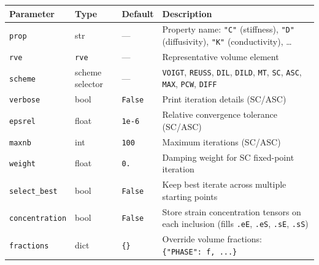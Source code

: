 \documentclass[
  a4paper,
  numbers=noendperiod,
  DIV=12]{scrreprt}
\newcounter{none} %
\begin{document}
{\def\LTcaptype{none} %
\begin{longtable}[]{@{}
  >{\raggedright\arraybackslash}p{}
  >{\raggedright\arraybackslash}p{}
  >{\raggedright\arraybackslash}p{}
  >{\raggedright\arraybackslash}p{}@{}}
\toprule\noalign{}
\begin{minipage}[b]{\linewidth}\raggedright
Parameter
\end{minipage} & \begin{minipage}[b]{\linewidth}\raggedright
Type
\end{minipage} & \begin{minipage}[b]{\linewidth}\raggedright
Default
\end{minipage} & \begin{minipage}[b]{\linewidth}\raggedright
Description
\end{minipage} \\
\midrule\noalign{}
\endhead
\bottomrule\noalign{}
\endlastfoot
\texttt{prop} & str & --- & Property name: \texttt{"C"} (stiffness),
\texttt{"D"} (diffusivity), \texttt{"K"} (conductivity), \ldots{} \\
\texttt{rve} & \texttt{rve} & --- & Representative volume element \\
\texttt{scheme} & scheme selector & --- & \texttt{VOIGT},
\texttt{REUSS}, \texttt{DIL}, \texttt{DILD}, \texttt{MT}, \texttt{SC},
\texttt{ASC}, \texttt{MAX}, \texttt{PCW}, \texttt{DIFF} \\
\texttt{verbose} & bool & \texttt{False} & Print iteration details
(SC/ASC) \\
\texttt{epsrel} & float & \texttt{1e-6} & Relative convergence tolerance
(SC/ASC) \\
\texttt{maxnb} & int & \texttt{100} & Maximum iterations (SC/ASC) \\
\texttt{weight} & float & \texttt{0.} & Damping weight for SC
fixed-point iteration \\
\texttt{select\_best} & bool & \texttt{False} & Keep best iterate across
multiple starting points \\
\texttt{concentration} & bool & \texttt{False} & Store strain
concentration tensors on each inclusion (fills \texttt{.eE},
\texttt{.eS}, \texttt{.sE}, \texttt{.sS}) \\
\texttt{fractions} & dict & \texttt{\{\}} & Override volume fractions:
\texttt{\{"PHASE":\ f,\ ...\}} \\
\end{longtable}
}
\end{document}
